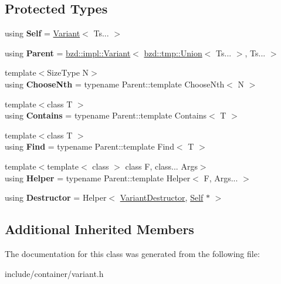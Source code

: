 \subsection*{Protected Types}
\begin{DoxyCompactItemize}
\item 
\mbox{\label{classbzd_1_1Variant_ada46df0e6ab14a948f3d97c874f07c08}} 
using {\bfseries Self} = \hyperlink{classbzd_1_1Variant}{Variant}$<$ Ts... $>$
\item 
\mbox{\label{classbzd_1_1Variant_a98caad4db689675837d0a47fd8ce6b2d}} 
using {\bfseries Parent} = \hyperlink{classbzd_1_1impl_1_1Variant}{bzd\+::impl\+::\+Variant}$<$ \hyperlink{unionbzd_1_1tmp_1_1impl_1_1Union}{bzd\+::tmp\+::\+Union}$<$ Ts... $>$, Ts... $>$
\item 
\mbox{\label{classbzd_1_1Variant_aadb08ede805cfc569d4d8230e8df40e0}} 
{\footnotesize template$<$Size\+Type N$>$ }\\using {\bfseries Choose\+Nth} = typename Parent\+::template Choose\+Nth$<$ N $>$
\item 
\mbox{\label{classbzd_1_1Variant_a4e86ed8d21727acc2a7e4bff508a721c}} 
{\footnotesize template$<$class T $>$ }\\using {\bfseries Contains} = typename Parent\+::template Contains$<$ T $>$
\item 
\mbox{\label{classbzd_1_1Variant_ada21832e12c1393ed7dfe5667d19eac4}} 
{\footnotesize template$<$class T $>$ }\\using {\bfseries Find} = typename Parent\+::template Find$<$ T $>$
\item 
\mbox{\label{classbzd_1_1Variant_a1049964211190ff2bf24197b9b2c1762}} 
{\footnotesize template$<$template$<$ class $>$ class F, class... Args$>$ }\\using {\bfseries Helper} = typename Parent\+::template Helper$<$ F, Args... $>$
\item 
\mbox{\label{classbzd_1_1Variant_a6208b79d9155b1d50dca7352f229f57d}} 
using {\bfseries Destructor} = Helper$<$ \hyperlink{structbzd_1_1Variant_1_1VariantDestructor}{Variant\+Destructor}, \hyperlink{classbzd_1_1Variant}{Self} $\ast$ $>$
\end{DoxyCompactItemize}
\subsection*{Additional Inherited Members}


The documentation for this class was generated from the following file\+:\begin{DoxyCompactItemize}
\item 
include/container/variant.\+h\end{DoxyCompactItemize}
